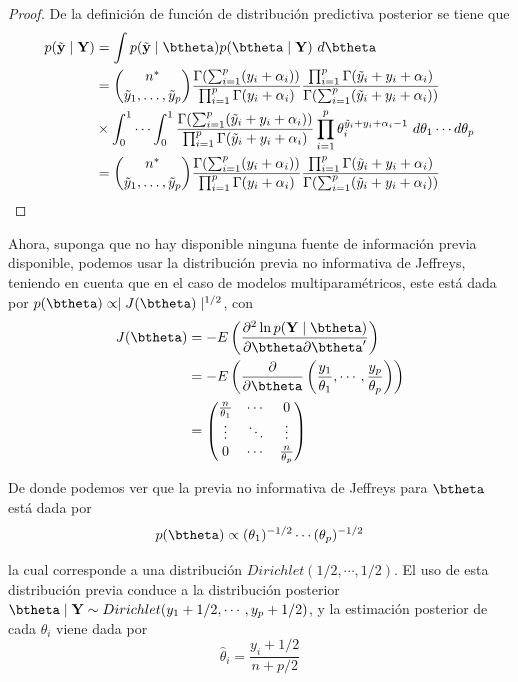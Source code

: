 \begin{proof}
De la definición de función de distribución predictiva posterior se tiene que
\begin{align*}
p(\tilde{\mathbf{y}} \mid \mathbf{Y})&=\int p(\tilde{\mathbf{y}} \mid \btheta)p(\btheta \mid \mathbf{Y})\ d\btheta\\
&=\binom{n^*}{\tilde{y}_1,\ldots,\tilde{y}_p} \frac{\Gamma(\sum_{i=1}^p(y_i+\alpha_i))}{\prod_{i=1}^p\Gamma(y_i+\alpha_i)}
\frac{\prod_{i=1}^p\Gamma(\tilde{y}_i+y_i+\alpha_i)}{\Gamma(\sum_{i=1}^p(\tilde{y}_i+y_i+\alpha_i))}\\
&\times
\int_0^1 \cdots \int_0^1 \frac{\Gamma(\sum_{i=1}^p(\tilde{y}_i+y_i+\alpha_i))}{\prod_{i=1}^p\Gamma(\tilde{y}_i+y_i+\alpha_i)}
\prod_{i=1}^p\theta_i^{\tilde{y}_i+y_i+\alpha_i-1} \ d\theta_1 \cdots d\theta_p\\
&=\binom{n^*}{\tilde{y}_1,\ldots,\tilde{y}_p} \frac{\Gamma(\sum_{i=1}^p(y_i+\alpha_i))}{\prod_{i=1}^p\Gamma(y_i+\alpha_i)}
\frac{\prod_{i=1}^p\Gamma(\tilde{y}_i+y_i+\alpha_i)}{\Gamma(\sum_{i=1}^p(\tilde{y}_i+y_i+\alpha_i))}
\end{align*}
\end{proof}

Ahora, suponga que no hay disponible ninguna fuente de información previa disponible, podemos usar la distribución previa no informativa de Jeffreys, teniendo en cuenta que en el caso de modelos multiparamétricos, este está dada por $p(\btheta)\propto \mid J(\btheta)\mid^{1/2}$, con 
\begin{align*}
J(\btheta)&=-E\left(\dfrac{\partial^2 \ln p(\mathbf{Y}\mid\btheta)}{\partial\btheta\partial\btheta'}\right)\\
&=-E\left(\dfrac{\partial}{\partial\btheta}\left(\frac{y_1}{\theta_1},\cdots,\frac{y_p}{\theta_p}\right)\right)\\
&=\begin{pmatrix}\frac{n}{\theta_1}&\cdots&0\\
\vdots&\ddots&\vdots\\0&\cdots&\frac{n}{\theta_p}\end{pmatrix}
\end{align*}

De donde podemos ver que la previa no informativa de Jeffreys para $\btheta$ está dada por 
\begin{equation*}
p(\btheta)\propto(\theta_1)^{-1/2}\cdots(\theta_p)^{-1/2}
\end{equation*}

la cual corresponde a una distribución $Dirichlet(1/2,\cdots,1/2)$. El uso de esta distribución previa conduce a la distribución posterior $\btheta\mid\mathbf{Y}\sim Dirichlet(y_1+1/2,\cdots,y_p+1/2)$, y la estimación posterior de cada $\theta_i$ viene dada por 
\begin{equation*}
\hat{\theta}_i=\frac{y_i+1/2}{n+p/2}
\end{equation*}

